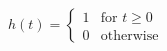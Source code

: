 \documentclass[preview]{standalone}
\begin{document}
\begin{align*}
h(t) = \begin{cases} 1 & \text{for } t \geq 0 \\ 0 & \text{otherwise} \end{cases}
\end{align*}
\end{document}
